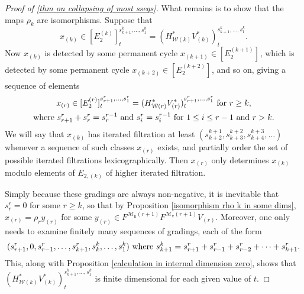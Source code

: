 \documentclass[11pt]{amsart} \renewcommand{\baselinestretch}{1.2}
\theoremstyle{plain}
\theoremstyle{definition}
\newcommand{\calw}{\mathcal{W}}
\newcommand{\calMv}{\mathcal{M}\dver}
\newcommand{\calMh}{\mathcal{M}\dhor}
\newcommand{\E}[5]{[E^{#1}_{#2}#3]^{#4}_{#5}}
\newcommand{\dver}{_\mathrm{v}}
\newcommand{\dhor}{_\mathrm{h}}
\begin{document}
\begin{Calculations of HWn}
\begin{proof}[Proof of \ref{thm on collapsing of most sseqs}]
What remains is to show that the maps $\rho_k$ are isomorphisms. Suppose that 
\[x_{(k)}\in \E{(k)}{2}{}{{s_{k+1}^{k},\ldots,s_1^{k}}}{t}=(H^*_{\calw(k)}V^*_{(k)})^{s_{k+1}^{k},\ldots,s_1^{k}}_t.\]
Now $x_{(k)}$ is detected by some permanent cycle $x_{(k+1)}\in \E{(k+1)}{2}{}{}{}$, which is detected by some permanent cycle $x_{(k+2)}\in \E{(k+2)}{2}{}{}{}$, and so on, giving a sequence of elements
\begin{gather*}
x_{(r)}\in \E{(r)}{2}{}{s_{r+1}^{r},\ldots,s_1^{r}}{t}=(H^*_{\calw(r)}V^*_{(r)})^{s_{r+1}^{r},\ldots,s_1^{r}}_t\textup{ for $r\geq k$,}\\
\textup{where }s^{r}_{r+1}+s^{r}_{r}=s^{r-1}_{r}\textup{ and }s^{r}_{i}=s^{r-1}_{i}\textup{  for $1\leq i\leq r-1$ and $r>k$}.
\end{gather*}
We will say that $x_{(k)}$ has iterated filtration at least $(s^{k+1}_{k+2},s^{k+2}_{k+3},s^{k+3}_{k+4},\ldots)$ whenever a sequence of such classes $x_{(r)}$ exists, and partially order the set of possible iterated filtrations lexicographically. Then $x_{(r)}$ only determines $x_{(k)}$ modulo elements of $E_{2,(k)}$ of higher iterated filtration.

Simply because these gradings are always non-negative, it is inevitable that $s_r^r=0$ for some $r\geq k$, so that by Proposition \ref{isomorphism rho k in some dims}, $x_{(r)}=\rho_ry_{(r)}$ for some $y_{(r)}\in F^{\calMh(r+1)}F^{\calMv(r+1)}V_{(r)}$. Moreover, one only needs to examine finitely many sequences of gradings, each of the form
\[(s^r_{r+1},0,s^{r}_{r-1},\ldots, s^{r}_{k+1},s^k_{k},\ldots,s^k_1)\textup{ where }s^k_{k+1}=s^r_{r+1}+s^{r}_{r-1}+s^{r}_{r-2}+\cdots +s^{r}_{k+1}.\]
This, along with Proposition \ref{calculation in internal dimension zero}, shows that $(H^*_{\calw(k)}V^*_{(k)})^{s_{k+1}^{k},\ldots,s_1^{k}}_t$ is finite dimensional for each given value of $t$.




\end{proof}
\end{Calculations of HWn}
\end{document}
